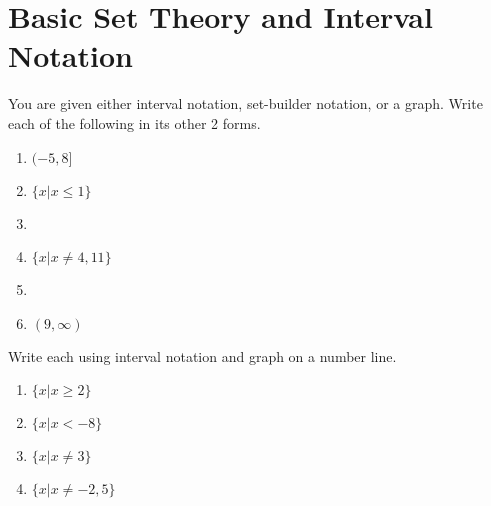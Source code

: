 \chapter{Basic Set Theory and Interval Notation}

You are given either interval notation, set-builder notation, or a graph. Write each of the following in its other 2 forms. 
\begin{enumerate}
\setlength\itemsep{10pt}
    \item $(-5, 8]$
    \item $\{x|x \leq 1\}$
    \item
    \item $\{x | x \neq 4, 11\}$
    \item
    \item $(9, \infty)$
\setcounter{Review}{\value{enumi}}
\end{enumerate}

Write each using interval notation and graph on a number line.
\begin{enumerate}
\setcounter{enumi}{\value{Review}}
\item $\{x | x \geq 2\}$
\item $\{x |x < -8\}$
\item $\{x |x \neq 3\}$
\item $\{x | x \neq -2, 5\}$
\setcounter{Review}{\value{enumi}}
\end{enumerate}

